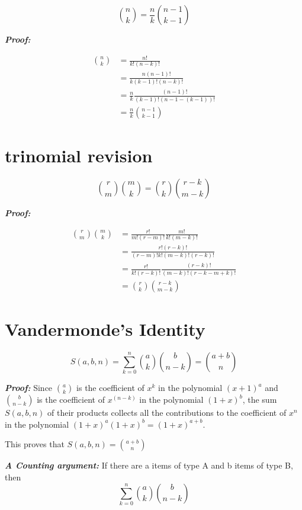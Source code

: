 \documentclass{article}
\begin{document}
\[
    \binom{n}{k} = \frac{n}{k} \binom{n-1}{k-1}
\]

\textbf{\textit{Proof:}}

\begin{align*}
    \binom{n}{k} &= \frac{n!}{k!(n-k)!} \\
                 &= \frac{n(n-1)!}{k(k-1)!(n-k)!} \\
                 &= \frac{n}{k}\frac{(n-1)!}{(k-1)!(n-1-(k-1))!} \\
                 &= \frac{n}{k} \binom{n-1}{k-1}
\end{align*}


\section{trinomial revision}

\[
    \binom{r}{m} \binom{m}{k} = \binom{r}{k} \binom{r-k}{m-k}
\]

\textbf{\textit{Proof:}}

\begin{align*}
    \binom{r}{m} \binom{m}{k} &= \frac{r!}{m!(r-m)!} \frac{m!}{k!(m-k)!} \\
                              &= \frac{r!(r-k)!}{(r-m)!k!(m-k)!(r-k)!} \\
                              &= \frac{r!}{k!(r-k)!} \frac{(r-k)!}{(m-k)!(r-k-m+k)!} \\
                              &= \binom{r}{k} \binom{r-k}{m-k}
\end{align*}

\newpage

\section{Vandermonde's Identity}

\[
    S(a,b,n) = \sum_{k=0}^n {a \choose k} {b \choose n-k} = {a+b\choose n}
\]

\textbf{\textit{Proof:}}
Since ${a\choose k}$ is the coefficient of $x^k$ in the polynomial ${(x+1)}^a$ and ${b\choose n-k}$ is the coefficient of $x^{(n-k)}$ in the polynomial ${(1+x)}^b$, the sum $S(a,b,n)$ of their products collects all the contributions to the coefficient of $x^n$ in the polynomial ${(1+x)}^a{(1+x)}^b={(1+x)}^{a+b}$.

This proves that $S(a,b,n) = {a+b \choose n}$


\textbf{\textit{A Counting argument:}}
If there are a items of type A and b items of type B, then
\[
    \sum_{k=0}^{n} {a \choose k} {b \choose n-k}
\]
\end{document}
